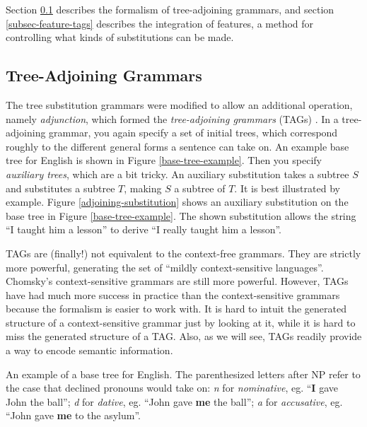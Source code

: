 \documentclass[12pt]{article}
\newcommand{\defn}[1]{\textit{#1}}
\begin{document}
Section \ref{subsec-tags} describes the formalism of tree-adjoining
grammars, and section \ref{subsec-feature-tags} describes the
integration of features, a method for controlling what kinds of
substitutions can be made.

\subsection{Tree-Adjoining Grammars}
\label{subsec-tags}

The tree substitution grammars were modified to allow an additional
operation, namely \defn{adjunction}, which formed the
\defn{tree-adjoining grammars} (TAGs) \cite{Joshi-1975}.  In a tree-adjoining grammar, you
again specify a set of initial trees, which correspond roughly to the
different general forms a sentence can take on.  An example base tree
for English is shown in Figure \ref{base-tree-example}.  Then you
specify \defn{auxiliary trees}, which are a bit tricky.  An auxiliary
substitution takes a subtree $S$ and substitutes a subtree $T$, making
$S$ a subtree of $T$.  It is best illustrated by example.  Figure
\ref{adjoining-substitution} shows an auxiliary substitution on the base
tree in Figure \ref{base-tree-example}.  The shown substitution allows
the string ``I taught him a lesson'' to derive ``I really taught him a
lesson''.

TAGs are (finally!) not equivalent to the context-free grammars.  They
are strictly more powerful, generating the set of ``mildly
context-sensitive languages''.  Chomsky's context-sensitive grammars are
still more powerful.  However, TAGs have had much more success in
practice than the context-sensitive grammars because the formalism is
easier to work with.  It is hard to intuit the generated structure of a
context-sensitive grammar just by looking at it, while it is hard to
miss the generated structure of a TAG.  Also, as we will see, TAGs
readily provide a way to encode semantic information.

\begin{Figure}
\begin{center}
\end{center}
\caption{An example of a base tree for English.  The parenthesized
letters after NP refer to the case that declined pronouns would take on:
\textit{n} for \defn{nominative}, eg. ``\textbf{I} gave John the
ball''; \textit{d} for \defn{dative}, eg. ``John gave \textbf{me} the
ball''; \textit{a} for \defn{accusative}, eg.  ``John gave \textbf{me}
to the asylum''.}
\label{base-tree-example}
\end{Figure}
\end{document}
